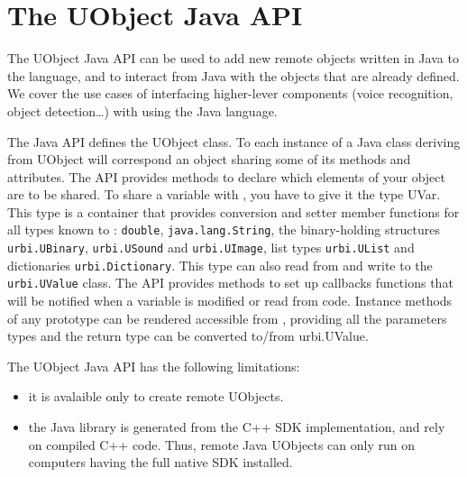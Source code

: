 

\chapter{The UObject Java API}
\label{sec:uob:apijava}

The UObject Java API can be used to add new remote objects written in Java
to the \us language, and to interact from Java with the objects that are
already defined. We cover the use cases of interfacing higher-lever components
(voice recognition, object detection\ldots) with \urbi using the Java language.

The Java API defines the UObject class. To each instance of a Java class
deriving from UObject will correspond an \us object sharing some of its
methods and attributes. The API provides methods to declare which elements
of your object are to be shared. To share a variable with \urbi, you have to
give it the type UVar. This type is a container that provides conversion and
setter member functions for all types known to \urbi: \lstinline{double},
\lstinline{java.lang.String}, the binary-holding structures
\lstinline{urbi.UBinary}, \lstinline{urbi.USound} and
\lstinline{urbi.UImage}, list types \lstinline{urbi.UList} and dictionaries
\lstinline{urbi.Dictionary}. This type can also read from and write to the
\lstinline{urbi.UValue} class. The API provides methods to set up callbacks
functions that will be notified when a variable is modified or read from
\urbi code. Instance methods of any prototype can be rendered accessible
from \us, providing all the parameters types and the return type can be
converted to/from urbi.UValue.

The UObject Java API has the following limitations:
\begin{itemize}
\item it is avalaible only to create remote UObjects.
\item the Java library is generated from the C++ SDK implementation, and rely
on compiled C++ code. Thus, remote Java UObjects can only run on computers
having the full \urbi native SDK installed.
\end{itemize}


